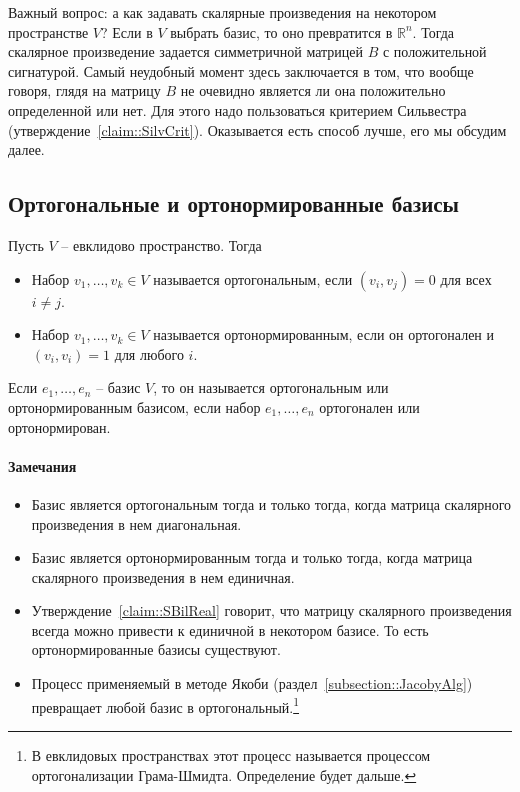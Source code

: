 Важный вопрос: а как задавать скалярные произведения на некотором пространстве $V$? Если в $V$ выбрать базис, то оно превратится в $\mathbb R^n$. Тогда скалярное произведение задается симметричной матрицей $B$ с положительной сигнатурой. Самый неудобный момент здесь заключается в том, что вообще говоря, глядя на матрицу $B$ не очевидно является ли она положительно определенной или нет. Для этого надо пользоваться критерием Сильвестра (утверждение~\ref{claim::SilvCrit}). Оказывается есть способ лучше, его мы обсудим далее.


\subsection{Ортогональные и ортонормированные базисы}

\begin{definition}
Пусть $V$ -- евклидово пространство. Тогда
\begin{itemize}
\item Набор $v_1,\ldots,v_k\in V$ называется ортогональным, если $(v_i,v_j) = 0$ для всех $i\neq j$. 
\item Набор $v_1,\ldots,v_k\in V$ называется ортонормированным, если он ортогонален и $(v_i,v_i) = 1$ для любого $i$.
\end{itemize}
Если $e_1,\ldots,e_n$ -- базис $V$, то он называется ортогональным или ортонормированным базисом, если набор $e_1,\ldots,e_n$ ортогонален или ортонормирован.
\end{definition}

\paragraph{Замечания}
\begin{itemize}
\item Базис является ортогональным тогда и только тогда, когда матрица скалярного произведения в нем диагональная. 

\item Базис является ортонормированным тогда и только тогда, когда матрица скалярного произведения в нем единичная.

\item Утверждение~\ref{claim::SBilReal} говорит, что матрицу скалярного произведения всегда можно привести к единичной в некотором базисе. То есть ортонормированные базисы существуют.

\item Процесс применяемый в методе Якоби (раздел~\ref{subsection::JacobyAlg}) превращает любой базис в ортогональный.\footnote{В евклидовых пространствах этот процесс называется процессом ортогонализации Грама-Шмидта. Определение будет дальше.}
\end{itemize}


